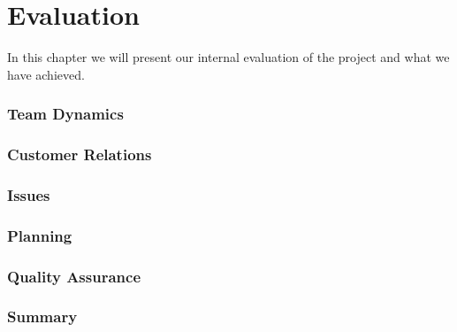 \chapter{Evaluation}

\minitoc

In this chapter we will present our internal evaluation of the project and what we have achieved.

\clearpage

\subsection{Team Dynamics}


\subsection{Customer Relations}


\subsection{Issues}


\subsection{Planning}


\subsection{Quality Assurance}


\subsection{Summary}